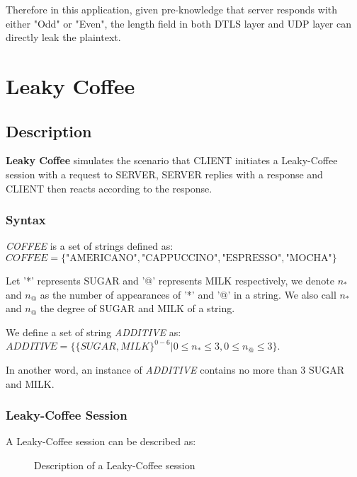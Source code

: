Therefore in this application, given pre-knowledge that server responds with either "Odd" or "Even", the length field in both DTLS layer and UDP layer can directly leak the plaintext. 

\section{Leaky Coffee}

\subsection{Description}
\textbf{Leaky Coffee} simulates the scenario that CLIENT initiates a Leaky-Coffee session with a request to SERVER, SERVER replies with a response and CLIENT then reacts according to the response.

\subsubsection{Syntax}
\begin{definition}
\textit{COFFEE} is a set of strings defined as:\\
 $COFFEE = \{  {\text{"AMERICANO"}}, \text{"CAPPUCCINO"}, \text{"ESPRESSO"}, \text{"MOCHA"}\}$
\end{definition}

\begin{definition}
Let '*' represents SUGAR and '@' represents MILK respectively, we denote $n_*$ and $n_@$ as the number of appearances of '*' and '@' in a string. We also call $n_*$ and $n_@$ the degree of SUGAR and MILK of a string.
\end{definition}

\begin{definition}
We define a set of string \textit{ADDITIVE} as:\\
$ADDITIVE = \{\{ SUGAR, MILK \}^{0 - 6} | 0 \leq n_{*} \leq 3, 0 \leq n_{@} \leq 3 \}$.

In another word, an instance of \textit{ADDITIVE} contains no more than 3 SUGAR and MILK.
\end{definition}

\subsubsection{Leaky-Coffee Session}
A Leaky-Coffee session can be described as:

\begin{figure}[H] \label{Fig:Leaky-Coffee Session}
\caption{Description of a Leaky-Coffee session}
\centering
\resizebox{14cm}{!}
{}
\end{figure}

